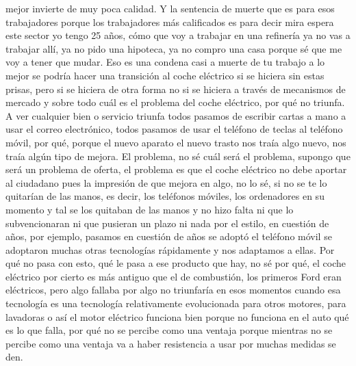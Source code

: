 mejor invierte de muy poca calidad. Y la sentencia de muerte que es para esos trabajadores porque los trabajadores más calificados es para decir mira espera este sector yo tengo 25 años, cómo que voy a trabajar en una refinería ya no vas a trabajar allí, ya no pido una hipoteca, ya no compro una casa porque sé que me voy a tener que mudar. Eso es una condena casi a muerte de tu trabajo a lo mejor se podría hacer una transición al coche eléctrico si se hiciera sin estas prisas, pero si se hiciera de otra forma no si se hiciera a través de mecanismos de mercado y sobre todo cuál es el problema del coche eléctrico, por qué no triunfa. A ver cualquier bien o servicio triunfa todos pasamos de escribir cartas a mano a usar el correo electrónico, todos pasamos de usar el teléfono de teclas al teléfono móvil, por qué, porque el nuevo aparato el nuevo trasto nos traía algo nuevo, nos traía algún tipo de mejora. El problema, no sé cuál será el problema, supongo que será un problema de oferta, el problema es que el coche eléctrico no debe aportar al ciudadano pues la impresión de que mejora en algo, no lo sé, si no se te lo quitarían de las manos, es decir, los teléfonos móviles, los ordenadores en su momento y tal se los quitaban de las manos y no hizo falta ni que lo subvencionaran ni que pusieran un plazo ni nada por el estilo, en cuestión de años, por ejemplo, pasamos en cuestión de años se adoptó el teléfono móvil se adoptaron muchas otras tecnologías rápidamente y nos adaptamos a ellas. Por qué no pasa con esto,  qué le pasa a ese producto que hay, no sé por qué, el coche eléctrico por cierto es más antiguo que el de combustión, los primeros Ford eran eléctricos, pero algo fallaba por algo no triunfaría en esos momentos cuando esa tecnología es una tecnología relativamente evolucionada para otros motores, para lavadoras o así el motor eléctrico funciona bien porque no funciona en el auto qué es lo que falla, por qué no se percibe como una ventaja porque mientras no se percibe como una ventaja va a haber resistencia a usar por muchas medidas se den.

